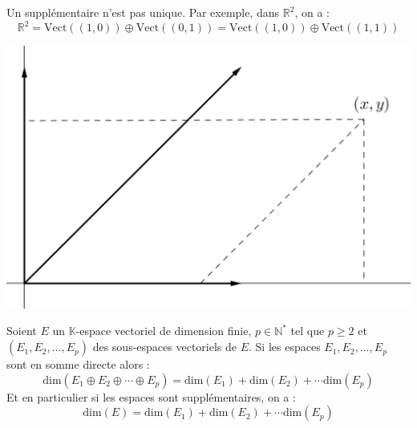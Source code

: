 \documentclass[a4paper,10pt]{report}
\begin{document}
\medskip

\begin{att} Un supplémentaire n'est pas unique. Par exemple, dans $\mathbb{R}^2$, on a :
$$ \mathbb{R}^2 = \textrm{Vect}((1,0)) \oplus \textrm{Vect}((0,1)) = \textrm{Vect}((1,0)) \oplus \textrm{Vect}((1,1))$$

\medskip


\begin{center}
\includegraphics[scale=0.3]{Supp}
\end{center}
\end{att}

\begin{Proposition}{} 
Soient $E$ un $\mathbb{K}$-espace vectoriel de dimension finie, $p \in \mathbb{N}^*$ tel que $p \geq 2$ et $(E_1, E_2, \ldots, E_p)$ des sous-espaces vectoriels de $E$. Si les espaces $E_1, E_2, \ldots, E_p$ sont en somme directe alors :
$$ \textrm{dim}(E_1 \oplus E_2 \oplus \cdots \oplus E_p) =\textrm{dim}(E_1) + \textrm{dim}(E_2) + \cdots \textrm{dim}(E_p)$$
Et en particulier si les espaces sont supplémentaires, on a :
$$ \textrm{dim}(E) = \textrm{dim}(E_1) + \textrm{dim}(E_2) + \cdots \textrm{dim}(E_p)$$
\end{Proposition}

\begin{Demonstration}{} 

\vspace{6cm}
\end{Demonstration}
\end{document}
